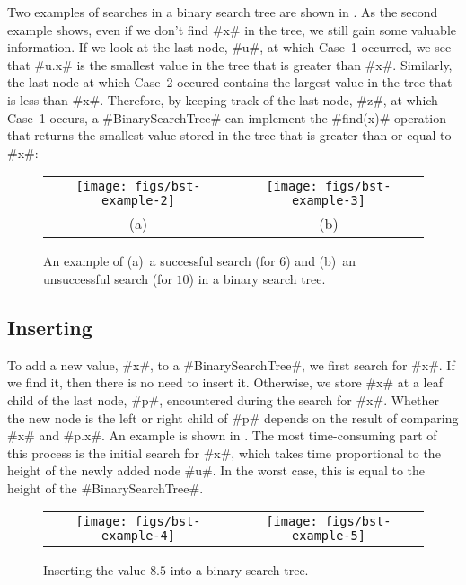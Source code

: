 Two examples of searches in a binary search tree are shown in
.  As the second example shows, even if we don't find #x#
in the tree, we still gain some valuable information.  If we look at
the last node, #u#, at which Case~1 occurred, we see that #u.x# is the smallest
value in the tree that is greater than #x#.  Similarly, the last node
at which Case~2 occured contains the largest value in the tree that is
less than #x#.  Therefore, by keeping track of the last node, #z#,
at which Case~1 occurs, a #BinarySearchTree# can implement the #find(x)#
operation that returns the smallest value stored in the tree that is
greater than or equal to #x#:

\begin{figure}
  \begin{center}
    \begin{tabular}{cc}
    \texttt{[image: figs/bst-example-2]} &
    \texttt{[image: figs/bst-example-3]} \\
    (a) & (b)
    \end{tabular}
  \end{center}
  \caption{An example of (a)~a successful search (for $6$) and (b)~an unsuccessful search (for $10$) in a binary search tree.}
\end{figure}


\subsection{Inserting}

To add a new value, #x#, to a #BinarySearchTree#, we first search for
#x#. If we find it, then there is no need to insert it.  Otherwise,
we store #x# at a leaf child of the last node, #p#, encountered during the
search for #x#. Whether the new node is the left or right child of #p# depends on the result of comparing #x# and #p.x#.
An example is shown in . The most time-consuming
part of this process is the initial search for #x#, which takes time
proportional to the height of the newly added node #u#.  In the worst
case, this is equal to the height of the #BinarySearchTree#.

\begin{figure}
  \begin{center}
    \begin{tabular}{cc}
    \texttt{[image: figs/bst-example-4]} &
    \texttt{[image: figs/bst-example-5]} 
    \end{tabular}
  \end{center}
  \caption{Inserting the value $8.5$ into a binary search tree.}
\end{figure}


